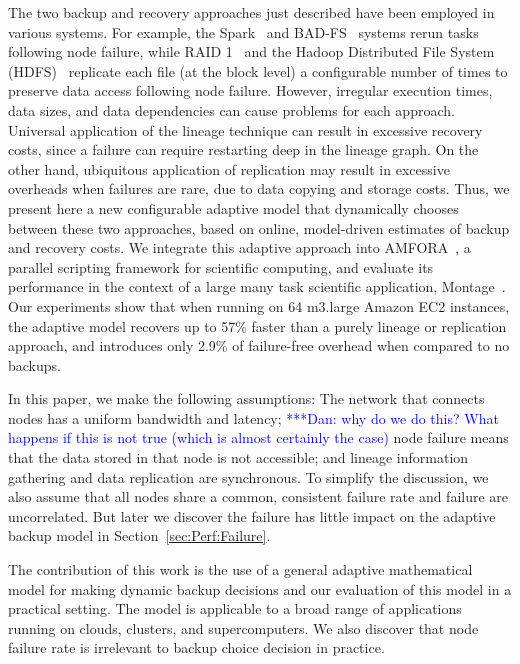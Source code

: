 \documentclass{sig-alternate}
\newcommand{\katznote}[1]{ {\textcolor{blue}    { ***Dan:      #1 }}}
\newcommand{\zhaonote}[1]{{\textcolor{cyan}    { ***Zhao:      #1 }}}
\newcommand{\katznote}[1]{}
\newcommand{\zhaonote}[1]{}
\begin{document}
The two backup and recovery approaches just described have been employed in various systems. For example,
the Spark~\cite{RDD2012} and BAD-FS~\cite{badfs2004} systems rerun tasks following node failure,
while RAID 1~\cite{raid1988} and the Hadoop Distributed File System (HDFS)~\cite{HDFS} replicate each file (at the block level) a configurable number of times to preserve data access following node failure.
However, irregular execution times, data sizes, and data dependencies can cause problems for each approach. Universal application of the lineage technique can result in excessive recovery costs, since a failure can 
require restarting deep in the lineage graph.
On the other hand, ubiquitous application of replication may result in excessive overheads when failures are rare, due to data copying and storage costs.
Thus, we present here a new configurable adaptive model that dynamically chooses between these two approaches,
based on online, model-driven estimates of backup and recovery costs. We integrate this adaptive approach into
AMFORA~\cite{AMFS2013},
a parallel scripting framework for scientific computing, and evaluate its performance in the context of a large many task scientific application, Montage~\cite{montage2, montage1}. 
Our experiments show that when running on 64 m3.large Amazon EC2 instances, the adaptive model recovers up to 57\% faster than a purely lineage or replication approach, and introduces only 2.9\% of failure-free overhead when compared to no backups.



In this paper, we make the following assumptions: The network that connects nodes has a uniform bandwidth and latency;  \katznote{why do we do this?  What happens if this is not true (which is almost certainly the case)} node failure means that the data stored in that node is not accessible; and lineage information gathering and data replication are synchronous. To simplify the discussion, we also assume that all nodes share a common, consistent failure rate and failure are uncorrelated. But later we discover the failure has little impact on the adaptive backup model in Section~\ref{sec:Perf:Failure}. 


The contribution of this work is the use of a general adaptive mathematical model for making dynamic backup decisions and our evaluation of this model in a practical setting.
The model is applicable to a broad range of applications running on clouds, clusters, and supercomputers. We also discover that node failure rate is irrelevant to backup choice decision in practice.
\end{document}
